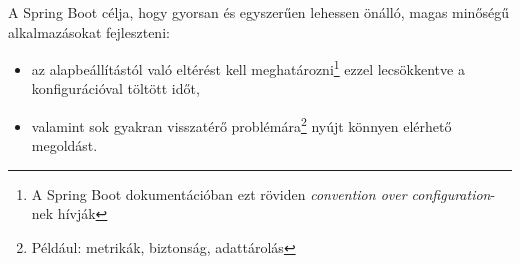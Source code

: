 A Spring Boot \cite{introducing_spring_boot} célja, hogy gyorsan és egyszerűen lehessen önálló, magas minőségű alkalmazásokat fejleszteni:
\begin{itemize}
	\item az alapbeállítástól való eltérést kell meghatározni\footnote{A Spring Boot dokumentációban ezt röviden \emph{convention over configuration}-nek hívják} ezzel lecsökkentve a konfigurációval töltött időt,
	\item valamint sok gyakran visszatérő problémára\footnote{Például: metrikák, biztonság, adattárolás} nyújt könnyen elérhető megoldást.
\end{itemize}



